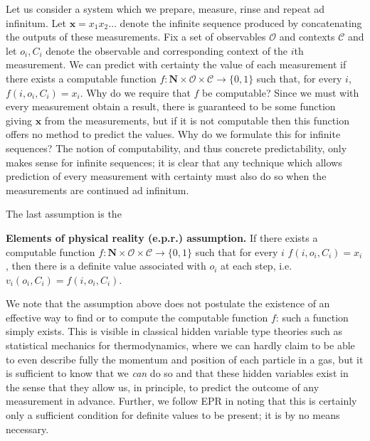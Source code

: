 \documentclass[%
 preprint,
 showpacs,
 showkeys,
 amsmath,
 amssymb,
 aps,
 pra,
 ]{revtex4-1}
\theoremstyle{definition}
\newcommand{\seq}[1]{\mathbf{#1}}
\begin{document}
Let us consider a system which we prepare, measure, rinse and repeat ad infinitum.
Let $\seq{x}=x_1 x_2 \dots$ denote the infinite sequence produced by concatenating the outputs of these measurements.
Fix a set of observables $\mathcal{O}$ and contexts $\mathcal{C}$ and let $o_i,C_i$ denote the observable and corresponding context of the $i$th measurement.
We can predict with certainty the value of each measurement if there exists a computable function
$f : \mathbf{N}\times \mathcal{O}\times \mathcal{C} \to \{0,1\}$ such that, for every $i$, $f(i,o_i,C_i)=x_i$.
Why do we require that $f$ be computable?
Since we must with every measurement obtain a result, there is guaranteed to be some function giving $\seq{x}$ from the measurements, but if it is not computable then this function offers no method to predict the values.
Why do we formulate this for infinite sequences?
The notion of computability, and thus concrete predictability, only makes sense for infinite sequences; it is clear that any technique which allows prediction of every measurement with certainty must also do so when the measurements are continued ad infinitum.

The last assumption is the

\textbf{Elements of physical reality (e.p.r.) assumption.} If
there exists a computable function $f : \mathbf{N}\times \mathcal{O}\times \mathcal{C} \to \{0,1\}$ such that for every $i$ $f(i,o_i,C_i)=x_i$, then there is a definite value associated with $o_i$ at each step, i.e.\ $v_i(o_i,C_i)=f(i,o_i,C_i)$.

We note that the assumption above does not postulate the existence of an effective way to find or to compute
 the computable function $f$: such a function simply exists.
This is visible in classical hidden variable type theories such as   statistical mechanics for thermodynamics, where we can hardly claim to be able to even describe fully the momentum and position of each particle in a gas, but it is sufficient to know that we \emph{can} do so and that these hidden variables exist in the sense that they allow us, in principle,  to predict the outcome of any measurement in advance.
Further, we follow EPR in noting that this is certainly only a sufficient condition for definite values to be present; it is by no means necessary.

\end{document}
